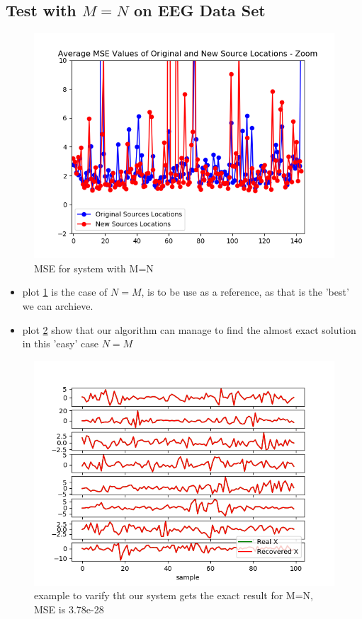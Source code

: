 
\subsection{Test with $M=N$ on EEG Data Set}

\begin{figure}[H]
    \centering
	\includegraphics[scale=0.5]{figures/ch_7/M=N_1.png}
	\caption{MSE for system with M=N}
	\label{fig:M=N_1}
\end{figure}  
\begin{itemize}
\item plot \ref{fig:M=N_1} is the case of $N=M$, is to be use as a reference, as that is the 'best' we can archieve. 
\item plot \ref{fig:M=N_test} show that our algorithm can manage to find the almost exact solution in this 'easy' case $N=M$ 
\end{itemize}
\begin{figure}[H]
    \centering
	\includegraphics[scale=0.5]{figures/ch_7/M=N_test.png}
	\caption{example to varify tht our system gets the exact result for M=N, MSE is 3.78e-28 }
	\label{fig:M=N_test}
\end{figure}






